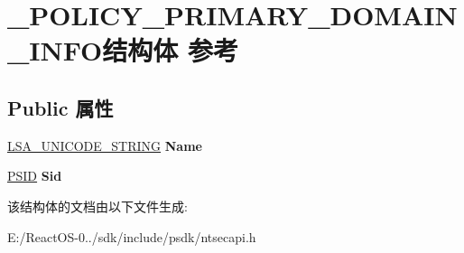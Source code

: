 \hypertarget{struct___p_o_l_i_c_y___p_r_i_m_a_r_y___d_o_m_a_i_n___i_n_f_o}{}\section{\+\_\+\+P\+O\+L\+I\+C\+Y\+\_\+\+P\+R\+I\+M\+A\+R\+Y\+\_\+\+D\+O\+M\+A\+I\+N\+\_\+\+I\+N\+F\+O结构体 参考}
\label{struct___p_o_l_i_c_y___p_r_i_m_a_r_y___d_o_m_a_i_n___i_n_f_o}
\subsection*{Public 属性}
\begin{DoxyCompactItemize}
\item 
\mbox{\label{struct___p_o_l_i_c_y___p_r_i_m_a_r_y___d_o_m_a_i_n___i_n_f_o_a72afca0374832a13e6d4f78c377a3970}} 
\hyperlink{struct___l_s_a___u_n_i_c_o_d_e___s_t_r_i_n_g}{L\+S\+A\+\_\+\+U\+N\+I\+C\+O\+D\+E\+\_\+\+S\+T\+R\+I\+NG} {\bfseries Name}
\item 
\mbox{\label{struct___p_o_l_i_c_y___p_r_i_m_a_r_y___d_o_m_a_i_n___i_n_f_o_a52f6b2ff2ba981a340f422a03c4693e8}} 
\hyperlink{struct___s_i_d}{P\+S\+ID} {\bfseries Sid}
\end{DoxyCompactItemize}


该结构体的文档由以下文件生成\+:\begin{DoxyCompactItemize}
\item 
E\+:/\+React\+O\+S-\/0../sdk/include/psdk/ntsecapi.\+h\end{DoxyCompactItemize}
